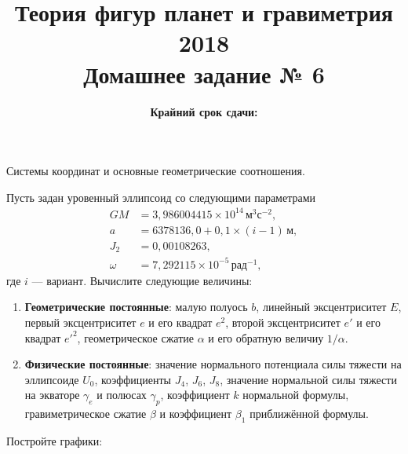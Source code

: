 \documentclass[11pt, a4paper,addpoints]{exam}
\title{{\Large Теория фигур планет и гравиметрия 2018}\\ 
    {\bf\Large Домашнее задание № 6}}
\author{}
\date{\normalsize\bf Крайний срок сдачи: \DTMusedate{deadline}}
\theoremstyle{remark}
\begin{document}
\maketitle
\begin{questions}
    \question[1] Системы координат и основные геометрические соотношения.
        \question[3] Пусть задан уровенный эллипсоид со следующими параметрами
        \begin{align*}
            GM &= 3,986004415 \times 10^{14}\,\textrm{м}^3\textrm{с}^{-2},\\
            a &= 6378136,0 + 0,1\times \left(i - 1\right)\,\textrm{м}, \\
            J_2 &= 0,00108263,\\
            \omega &= 7,292115 \times 10^{-5}\,\textrm{рад}^{-1}, 
        \end{align*}
        где $i$ --- вариант. Вычислите следующие величины:
        \begin{enumerate}
            \item \textbf{Геометрические постоянные}: малую полуось $b$, линейный эксцентриситет $E$, первый эксцентриситет $e$ и его
                квадрат $e^2$, второй эксцентриситет $e'$ и его квадрат $e'^2$, геометрическое
                сжатие $\alpha$ и его обратную величиу $1/\alpha$.
            \item \textbf{Физические постоянные}: значение нормального потенциала силы тяжести на эллипсоиде $U_0$, коэффициенты
                $J_4$, $J_6$, $J_8$, значение нормальной силы тяжести на экваторе $\gamma_e$ и полюсах
                $\gamma_p$, коэффициент $k$ нормальной формулы, гравиметрическое сжатие $\beta$ и
                коэффициент $\beta_1$ приближённой формулы.
        \end{enumerate}
    \question[1] Постройте графики: 
    \begin{parts}

\end{parts}
\end{questions}
\end{document}
